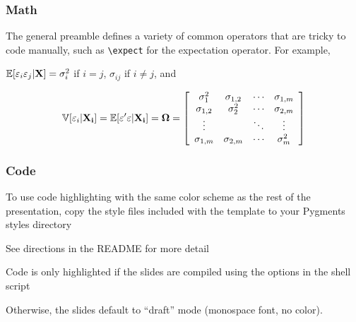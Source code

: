 \documentclass[aspectratio=169,handout]{beamer}
\begin{document}
\begin{frame}
	\frametitle{Math}
	\begin{witem}
	\item The general preamble defines a variety of common operators that are tricky to
		code manually, such as \texttt{\textbackslash{}expect} for the expectation operator. For example,

	\item
	 $\mathbb{E}[\varepsilon_i \varepsilon_j|\mathbf{X}] = \sigma_i^2$ if $i=j$, $\sigma_{ij}$ if $i \neq j$, and

		\begin{equation*}
		\mathbb{V}[\varepsilon_i|\mathbf{X_{i}}]
		=\mathbb{E}[\varepsilon^\prime \varepsilon | \mathbf{X_{i}}]
		= \boldsymbol{\Omega}
		= \left[
		\begin{array}{cccc}
			\sigma_1^2 		& \sigma_{1,2}	&	\cdots 	& \sigma_{1,m} 		\\
			\sigma_{1,2}		& \sigma_2^2 	&	\cdots 	& \sigma_{2,m} 		\\
			\vdots			&				&	\ddots	& \vdots				\\
			\sigma_{1,m}		& \sigma_{2,m}	&	\cdots 	& \sigma_m^2
		\end{array} \right]
		\end{equation*}
	\end{witem}
\end{frame}



%
%






\begin{frame}
	\frametitle{Code}
	\begin{witem}
		\item To use code highlighting with the same color scheme as
			the rest of the presentation, copy the style files included
			with the template to your Pygments styles directory
		\item See directions in the README for more detail
		\item Code is only highlighted if the slides are compiled using the
			options in the shell script
		\item Otherwise, the slides default to ``draft'' mode (monospace font,
			no color).
	\end{witem}
\end{frame}
\end{document}
